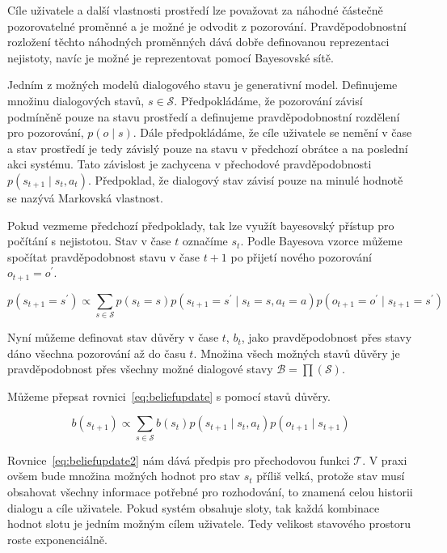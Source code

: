 Cíle uživatele a další vlastnosti prostředí lze považovat za náhodné částečně pozorovatelné proměnné a je možné je odvodit z pozorování.
Pravděpodobnostní rozložení těchto náhodných proměnných dává dobře definovanou reprezentaci nejistoty, navíc je možné je reprezentovat pomocí Bayesovské sítě.

Jedním z možných modelů dialogového stavu je generativní model.
Definujeme množinu dialogových stavů, $s \in \mathcal{S}$.
Předpokládáme, že pozorování závisí podmíněně pouze na stavu prostředí a definujeme pravděpodobnostní rozdělení pro pozorování, $p(o \mid s)$.
Dále předpokládáme, že cíle uživatele se nemění v čase a stav prostředí je tedy závislý pouze na stavu v předchozí obrátce a na poslední akci systému.
Tato závislost je zachycena v přechodové pravděpodobnosti $p(s_{t+1} \mid s_t, a_t)$.
Předpoklad, že dialogový stav závisí pouze na minulé hodnotě se nazývá Markovská vlastnost.

Pokud vezmeme předchozí předpoklady, tak lze využít bayesovský přístup pro počítání s nejistotou.
Stav v čase $t$ označíme $s_t$.
Podle Bayesova vzorce můžeme spočítat pravděpodobnost stavu v čase $t+1$ po přijetí nového pozorování $o_{t+1} = o^\prime$.

\begin{equation}
p(s_{t+1} = s^\prime) \propto
    \sum_{s \in \mathcal{S}}
        p(s_t = s)
        p(s_{t+1} = s^\prime \mid s_t = s, a_t = a) p(o_{t+1} = o^\prime \mid s_{t+1} = s^\prime)
\label{eq:beliefupdate}
\end{equation}

Nyní můžeme definovat stav důvěry v čase $t$, $b_t$, jako pravděpodobnost přes stavy dáno všechna pozorování až do času $t$.
Množina všech možných stavů důvěry je pravděpodobnost přes všechny možné dialogové stavy $\mathcal{B} = \prod(\mathcal{S})$.

Můžeme přepsat rovnici~\eqref{eq:beliefupdate} s pomocí stavů důvěry.

\begin{equation}
b(s_{t+1}) \propto
    \sum_{s \in \mathcal{S}}
        b(s_t)
        p(s_{t+1} \mid s_t, a_t)
        p(o_{t+1} \mid s_{t+1})
\label{eq:beliefupdate2}
\end{equation}

Rovnice~\eqref{eq:beliefupdate2} nám dává předpis pro přechodovou funkci $\mathcal{T}$.
V praxi ovšem bude množina možných hodnot pro stav $s_t$ příliš velká, protože stav musí obsahovat všechny informace potřebné pro rozhodování, to znamená celou historii dialogu a cíle uživatele. 
Pokud systém obsahuje sloty, tak každá kombinace hodnot slotu je jedním možným cílem uživatele. 
Tedy velikost stavového prostoru roste exponenciálně.

